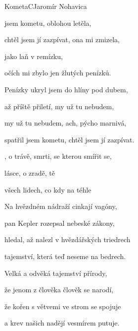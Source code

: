 \begin{song}{Kometa}{C}{Jaromír Nohavica}

\begin{SBVerse}

 jsem kometu, oblohou letěla,

chtěl jsem jí zazpívat, ona mi zmizela,

 jako laň  v remízku,

očích mi zbylo jen  žlutých penízků.

\end{SBVerse}

\begin{SBVerse}

Penízky ukryl jsem do hlíny pod dubem,

až příště přiletí, my už tu nebudem,

my už tu nebudem, ach, pýcho marnivá,

spatřil jsem kometu, chtěl jsem jí zazpívat.

\end{SBVerse}

\begin{SBChorus}

, o trávě,  smrti, se kterou smířit  se,

lásce, o zradě, tě

všech lidech, co kdy  na téhle 

\end{SBChorus}

\begin{SBVerse}

Na hvězdném nádraží cinkají vagóny,

pan Kepler rozepsal nebeské zákony,

hledal, až nalezl v hvězdářských triedrech

tajemství, která teď neseme na bedrech.

\end{SBVerse}

\begin{SBVerse}

Velká a odvěká tajemství přírody,

že jenom z člověka člověk se narodí,

že kořen s větvemi ve strom se spojuje

a krev našich nadějí vesmírem putuje.


\end{SBVerse}
\end{song}
